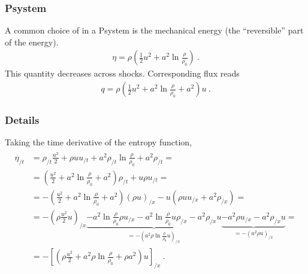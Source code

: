 \documentclass[letterpaper,10pt,english]{jupyterBook}
\begin{document}
\subsubsection{P\sphinxhyphen{}system}
\label{\detokenize{ch/pde/hyperbolic-entropy:p-system}}\label{\detokenize{ch/pde/hyperbolic-entropy:pde-hyperbolic-entropy-1d-system-p-sys}}
\sphinxAtStartPar
A common choice of  in a P\sphinxhyphen{}system is the mechanical energy (the “reversible” part of the energy).
\begin{equation*}
\begin{split}\eta = \rho \left( \frac{1}{2} u^2 + a^2 \ln \frac{\rho}{\rho_0} \right) \ .\end{split}
\end{equation*}
\sphinxAtStartPar
This quantity decreases across shocks. Corresponding flux reads
\begin{equation*}
\begin{split}q = \rho \left( \frac{1}{2} u^2 + a^2 \ln \frac{\rho}{\rho_0} + a^2 \right) u \ .\end{split}
\end{equation*}\subsubsection*{Details}

\sphinxAtStartPar
Taking the time derivative of the entropy function,
\begin{equation*}
\begin{split}\begin{aligned}
 \eta_{/t} 
 & = \rho_{/t} \frac{u^2}{2} + \rho u u_{/t} + a^2 \rho_{/t} \ln \frac{\rho}{\rho_0} + a^2 \rho_{/t} = \\
 & = \left( \frac{u^2}{2} + a^2 \ln \frac{\rho}{\rho_0} + a^2 \right) \rho_{/t} + u \rho u_{/t} = \\
 & = - \left( \frac{u^2}{2} + a^2 \ln \frac{\rho}{\rho_0} + a^2 \right) (\rho u)_{/x} - u \left( \rho u u_{/x} + a^2 \rho_{/x} \right) = \\
 & = - \left( \rho \frac{u^2}{2} u \right)_{/x} \underbrace{- a^2 \ln \frac{\rho}{\rho_0} \rho u_{/x} - a^2 \ln \frac{\rho}{\rho_0} u \rho_{/x} - a^2 \rho_{/x} u}_{= - \left( a^2 \rho \ln \frac{\rho}{\rho_0} u \right)_{/x}} \underbrace{- a^2 \rho u_{/x} - a^2 \rho_{/x} u}_{= - ( a^2 \rho u )_{/x}} = \\
 & = - \left[ \left( \rho \frac{u^2}{2} + a^2 \rho \ln \frac{\rho}{\rho_0} + \rho a^2  \right) u \right]_{/x} \ .
\end{aligned}\end{split}
\end{equation*}
\end{document}
